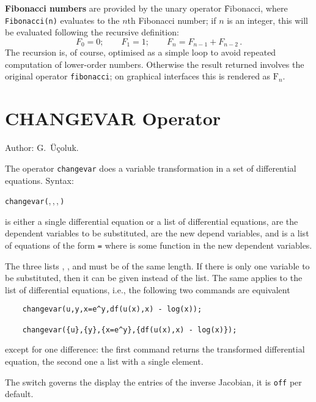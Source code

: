 \hypertarget{operator:FIBONACCI}{}
\textbf{Fibonacci numbers} are provided by the unary operator \f{Fibonacci},
where \texttt{Fibonacci(n)} evaluates to the $n$th Fibonacci
number; if $n$ is an integer, this will be evaluated following
the recursive definition:
\[F_0 = 0; \qquad F_1 = 1;\qquad F_n = F_{n-1} + F_{n-2}\,.\]
The recursion is, of course, optimised as a simple loop to avoid repeated
computation of lower-order numbers.
Otherwise the result returned involves the original operator
\texttt{fibonacci}; on graphical interfaces this is rendered
as $\mathrm{F}_n$.


\section{CHANGEVAR Operator}
\hypertarget{operator:CHANGEVAR}{}

\noindent
Author: G.~\"{U}\c{c}oluk.

The operator \texttt{changevar} does a variable transformation in a set of
differential equations.
Syntax:
\begin{syntaxtable}
  \texttt{changevar(},\,,\,,\,\texttt{)}
\end{syntaxtable}
 is either a single differential equation or a list of
differential equations,  are the dependent variables to
be substituted,  are the new depend variables, and
 is a list of equations of the form 
\texttt{=}  where  is some function
in the new dependent variables.

The three lists , , and  must
be of the same length. If there is only one variable to be
substituted, then it can be given instead of the list. The same applies to the list
of differential equations, i.e., the following two
commands are equivalent
\begin{verbatim}
    changevar(u,y,x=e^y,df(u(x),x) - log(x));

    changevar({u},{y},{x=e^y},{df(u(x),x) - log(x)});
\end{verbatim}
except for one difference: the first command returns the transformed differential
equation, the second one a list with a single element.

\hypertarget{switch:DISPJACOBIAN}{}
The switch  governs the display the entries of the inverse Jacobian,
it is \texttt{off} per default.

